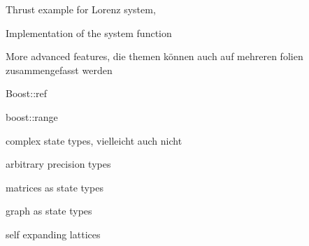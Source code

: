 \begin{frame}[fragile]

Thrust example for Lorenz system,

Implementation of the system function 

\end{frame}











\begin{frame}
 More advanced features, die themen können auch auf mehreren folien zusammengefasst werden
\end{frame}


\begin{frame}
 Boost::ref
\end{frame}

\begin{frame}
 boost::range
\end{frame}

\begin{frame}
 complex state types, vielleicht auch nicht
\end{frame}

\begin{frame}
 arbitrary precision types
\end{frame}

\begin{frame}
 matrices as state types
\end{frame}

\begin{frame}
 graph as state types
\end{frame}

\begin{frame}
 self expanding lattices
\end{frame}








